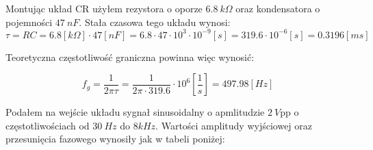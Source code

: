 \documentclass[14pt, table]{extarticle}
\begin{document}
\begin{figure}[H]
    \centering
    \qquad
\end{figure}

Montując układ CR użyłem rezystora o oporze $6.8 \ k \Omega$ oraz kondensatora o pojemności $47 \ nF$. Stała czasowa tego układu wynosi:
$$ \tau = RC = 6.8 \left[ k \Omega \right] \cdot 47 \left[ nF \right] = 6.8 \cdot 47 \cdot 10^3 \cdot 10^{-9} \left[ s \right] = 319.6 \cdot 10^{-6}  \left[ s \right] = 0.3196  \left[ ms \right] $$

Teoretyczna częstotliwość graniczna powinna więc wynosić:

$$ f_g = \frac{1}{2 \pi \tau} = \frac{1}{2 \pi \cdot 319.6} \cdot 10^{6} \left[ \frac{1}{s} \right] = 497.98  \left[ Hz \right] $$

Podałem na wejście układu sygnał sinusoidalny o apmlitudzie $2 \ V$pp o częstotliwościach od $30 \ Hz$ do $8 kHz$. Wartości amplitudy wyjściowej oraz przesunięcia fazowego wynosiły jak w tabeli poniżej: \\
\\
\end{document}

